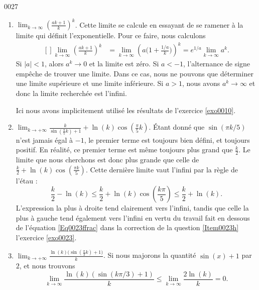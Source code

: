 
\begin{corrige}{0027}

\begin{enumerate}
\item $\lim_{k\to\infty}\left( \frac{ ak+1 }{ k } \right)^k$. 
Cette limite se calcule en essayant de se ramener à la limite qui définit l'exponentielle. Pour ce faire, nous calculons
\begin{equation}
	\begin{aligned}[]
		\lim_{k\to\infty}\left( \frac{ ak+1 }{ k } \right)^k	&=\lim_{k\to\infty}\left( a\big( 1+\frac{ 1/a }{ k } \big) \right)^k= e^{1/a}\lim_{k\to\infty}a^k.
	\end{aligned}
\end{equation}
Si $| a |<1$, alors $a^k\to 0$ et la limite est zéro. Si $a<-1$, l'alternance de signe empêche de trouver une limite. Dans ce cas, nous ne pouvons que déterminer une limite supérieure et une limite inférieure. Si $a>1$, nous avons $a^k\to\infty$ et donc la limite recherchée est l'infini.

Ici nous avons implicitement utilisé les résultats de l'exercice \ref{exo0010}.

\item $ \lim_{k \to  +\infty} \frac{k}{\sin(\frac{\pi}{5}k)+1} + \ln(k)\cos(\frac{\pi}{5}k) $.
Étant donné que $\sin(\pi k/5)$ n'est jamais égal à $-1$, le premier terme est toujours bien défini, et toujours positif. En réalité, ce premier terme est même toujours plus grand que $\frac{ k }{ 2 }$. Le limite que nous cherchons est donc plus grande que celle de $\frac{ k }{ 2 }+\ln(k)\cos\left( \frac{ \pi k }{ 5 } \right)$. Cette dernière limite vaut l'infini par la règle de l'étau :
\begin{equation}
	\frac{ k }{ 2 }-\ln(k)\leq\frac{ k }{2}+\ln(k)\cos\left( \frac{ k\pi }{ 5 } \right)\leq \frac{ k }{ 2 }+\ln(k).
\end{equation}
L'expression la plus à droite tend clairement vers l'infini, tandis que celle la plus à gauche tend également vers l'infini en vertu du travail fait en dessous de l'équation \eqref{Eq0023ffrac} dans la correction de la question \ref{Item0023h} l'exercice \ref{exo0023}.

\item
$ \lim_{k \to  +\infty} \frac{ \ln(k)\big(\sin(\frac{\pi}{3}k) +1\big)}{k} $.
Si nous majorons la quantité $\sin(x)+1$ par $2$, et nous trouvons
\begin{equation}
	\lim_{k\to\infty}\frac{ \ln(k)\left( \sin(k\pi/3)+1 \right) }{ k }\leq\lim_{k\to\infty}\frac{ 2\ln(k) }{ k }=0.
\end{equation}


\end{enumerate}
\end{corrige}
